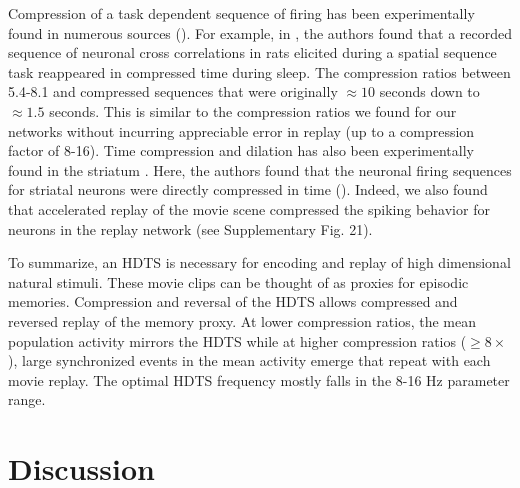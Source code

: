 \documentclass[11pt]{article} %
\begin{document}


Compression of a task dependent sequence of firing has been experimentally found in numerous sources (\cite{Euston,Mello,timecompression2}).  For example, in \cite{Euston}, the authors found that a recorded sequence of neuronal cross correlations in rats elicited during a spatial sequence task reappeared in compressed time during sleep.  The compression ratios between 5.4-8.1 and compressed sequences that were originally $\approx 10$ seconds down to $\approx 1.5$ seconds.  This is similar to the compression ratios we found for our networks without incurring appreciable error in replay (up to a compression factor of 8-16).   Time compression and dilation has also been experimentally found in the striatum \cite{B1,Mello}.  Here, the authors found that the neuronal firing sequences for striatal neurons were directly compressed in time (\cite{Mello}).  Indeed, we also found that accelerated replay of the movie scene compressed the spiking behavior for neurons in the replay network (see Supplementary Fig. 21).   

To summarize, an HDTS is necessary for encoding and replay of high dimensional natural stimuli.  These movie clips can be thought of as proxies for episodic memories.   Compression and reversal of the HDTS allows compressed and reversed replay of the memory proxy.  At lower compression ratios, the mean population activity mirrors the HDTS while at higher compression ratios ($\geq 8\times$), large synchronized events in the mean activity emerge that repeat with each movie replay.  The optimal HDTS frequency mostly falls in the 8-16 Hz parameter range.   




\section*{Discussion} 
\end{document}
